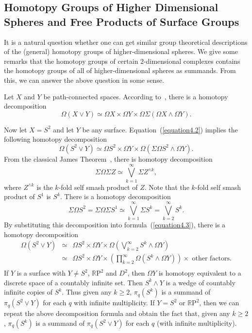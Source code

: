 \documentclass[10pt]{amsart}
\numberwithin{equation}{section}
\begin{document}
\subsection{Homotopy Groups of Higher Dimensional Spheres and Free Products of Surface Groups}
It is a natural question whether one can get similar group
theoretical descriptions of the (general) homotopy groups of
higher-dimensional spheres. We give some remarks that the homotopy
groups of certain $2$-dimensional complexes contains the homotopy
groups of all of higher-dimensional spheres as summands. From this,
we can answer the above question in some sense.

Let $X$ and $Y$ be path-connected spaces. According to~\cite{Gray}, there is a homotopy decomposition
\begin{equation}\label{equation4.2}
\Omega(X\vee Y)\simeq \Omega X\times \Omega Y\times \Omega\Sigma(\Omega X\wedge \Omega Y).
\end{equation}

Now let $X=S^2$ and let $Y$ be any surface. Equation~(\ref{equation4.2}) implies the following homotopy decomposition
\begin{equation}\label{equation4.3}
\Omega(S^2\vee Y)\simeq  \Omega S^2\times \Omega Y\times\Omega(\Sigma \Omega S^2\wedge \Omega Y).
\end{equation}
From the classical James Theorem~\cite{James1}, there is homotopy decomposition
$$
\Sigma\Omega\Sigma Z\simeq \bigvee_{k=1}^\infty \Sigma Z^{\wedge k},
$$
where $Z^{\wedge k}$ is the $k$-fold self smash product of $Z$. Note that the $k$-fold self smash product of $S^1$ is $S^k$. There is a homotopy decomposition
$$
\Sigma\Omega S^2=\Sigma\Omega\Sigma S^1\simeq \bigvee_{k=1}^\infty \Sigma S^k=\bigvee_{k=2}^\infty S^k.
$$
By substituting this decomposition into formula~(\ref{equation4.3}), there is a homotopy decomposition
$$
\begin{array}{rcl}
\Omega(S^2\vee Y)&\simeq & \Omega S^2\times \Omega Y\times\Omega \left(\bigvee_{k=2}^\infty S^k\wedge\Omega Y\right)\\
&\simeq& \Omega S^2\times \Omega Y \times \left(\prod_{k=2}^\infty \Omega (S^k\wedge \Omega Y) \right) \times\textrm{ other factors}.\\
\end{array}
$$
If $Y$ is a surface with $Y\not=S^2$, ${\mathbb{R}\mathrm{P}}^2$ and $D^2$, then $\Omega Y$ is homotopy equivalent to a discrete space of a countably infinite set. Then $S^k\wedge Y$ is a wedge of countably infinite copies of $S^k$. Thus given any $k\geq2$,
$\pi_q(S^k)$ is a summand of $\pi_q(S^2\vee Y)$ for each $q$ with infinite multiplicity. If $Y=S^2$ or ${\mathbb{R}\mathrm{P}}^2$, then we can repeat the above decomposition formula and obtain the fact that, given any $k\geq 2$, $\pi_q(S^k)$ is a summand of $\pi_q(S^2\vee Y)$ for each $q$ (with infinite multiplicity).
\end{document}
